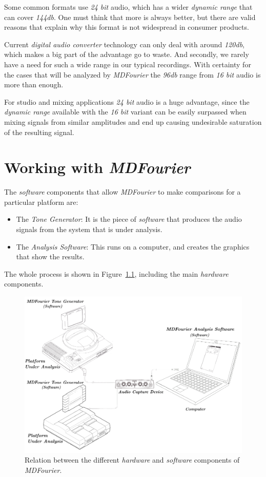 \documentclass[10pt,a4paper]{report}
\newcommand{\dbSPL}[1]{\textit{\mbox{#1\acrshort{db}}}}
\begin{document}
Some common formats use \textit{24 bit} audio, which has a wider \textit{dynamic range} that can cover \dbSPL{144}. One must think that more is always better, but there are valid reasons that explain why this format is not widespread in consumer products.

Current \textit{digital audio converter} technology can only deal with around \dbSPL{120}, which makes a big part of the advantage go to waste. And secondly, we rarely have a need for such a wide range in our typical recordings. With certainty for the cases that will be analyzed by \textit{MDFourier} the \dbSPL{96} range from \textit{16 bit} audio is more than enough. 

For studio and mixing applications \textit{24 bit} audio is a huge advantage, since the \textit{dynamic range} available with the \textit{16 bit} variant can be easily surpassed when mixing signals from similar amplitudes and end up causing undesirable saturation of the resulting signal.


\chapter{Working with \textit{MDFourier}}
\label{workflow}

The \textit{software} components that allow \textit{MDFourier} to make comparisons for a particular platform are:

\begin{itemize}
	\item The \textit{Tone Generator}: It is the piece of \textit{software} that produces the audio signals from the system that is under analysis. 
	\item The \textit{Analysis Software}: This runs on a computer, and creates the graphics that show the results. 
\end{itemize}

The whole process is shown in Figure~\ref{fig:mdfourierworkflow}, including the main \textit{hardware} components.

\begin{figure}[H]
	\centering
	\includegraphics[width=0.8\linewidth]{images/howitworks/MDFourierWorkFlow.png}
	\caption[Workflow]{Relation between the different \textit{hardware} and \textit{software} components of \textit{MDFourier}.}
	\label{fig:mdfourierworkflow}
\end{figure}
\end{document}
